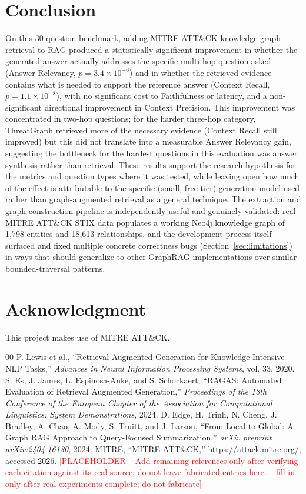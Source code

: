 \documentclass[conference]{IEEEtran}
\newcommand{\todoplaceholder}[1]{\textcolor{red}{[PLACEHOLDER -- #1 -- fill in only after real experiments complete; do not fabricate]}}
\begin{document}
\section{Conclusion}
On this 30-question benchmark, adding MITRE ATT\&CK knowledge-graph
retrieval to RAG produced a statistically significant improvement in
whether the generated answer actually addresses the specific multi-hop
question asked (Answer Relevancy, $p=3.4\times10^{-6}$) and in whether the
retrieved evidence contains what is needed to support the reference answer
(Context Recall, $p=1.1\times10^{-8}$), with no significant cost to
Faithfulness or latency, and a non-significant directional improvement in
Context Precision. This improvement was concentrated in two-hop questions;
for the harder three-hop category, ThreatGraph retrieved more of the
necessary evidence (Context Recall still improved) but this did not
translate into a measurable Answer Relevancy gain, suggesting the
bottleneck for the hardest questions in this evaluation was answer
synthesis rather than retrieval. These results support the research
hypothesis for the metrics and question types where it was tested, while
leaving open how much of the effect is attributable to the specific
(small, free-tier) generation model used rather than graph-augmented
retrieval as a general technique. The extraction and graph-construction
pipeline is independently useful and genuinely validated: real MITRE
ATT\&CK STIX data populates a working Neo4j knowledge graph of 1,798
entities and 18,613 relationships, and the development process itself
surfaced and fixed multiple concrete correctness bugs (Section~\ref{sec:limitations})
in ways that should generalize to other GraphRAG implementations over
similar bounded-traversal patterns.

\section*{Acknowledgment}
This project makes use of MITRE ATT\&CK\textregistered{}.

\begin{thebibliography}{00}
 P. Lewis et al., ``Retrieval-Augmented Generation for Knowledge-Intensive NLP Tasks,'' \emph{Advances in Neural Information Processing Systems}, vol. 33, 2020.
 S. Es, J. James, L. Espinosa-Anke, and S. Schockaert, ``RAGAS: Automated Evaluation of Retrieval Augmented Generation,'' \emph{Proceedings of the 18th Conference of the European Chapter of the Association for Computational Linguistics: System Demonstrations}, 2024.
 D. Edge, H. Trinh, N. Cheng, J. Bradley, A. Chao, A. Mody, S. Truitt, and J. Larson, ``From Local to Global: A Graph RAG Approach to Query-Focused Summarization,'' \emph{arXiv preprint arXiv:2404.16130}, 2024.
 MITRE, ``MITRE ATT\&CK,'' \url{https://attack.mitre.org/}, accessed 2026.
\todoplaceholder{Add remaining references only after verifying each citation against its real source; do not leave fabricated entries here.}
\end{thebibliography}
\end{document}
